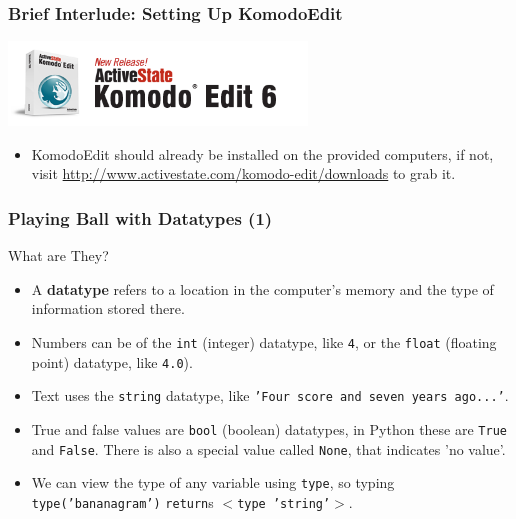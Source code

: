 \documentclass[10pt]{beamer}
\begin{document}
\begin{frame}
  \frametitle{Brief Interlude: Setting Up KomodoEdit}
  \begin{center}
    \includegraphics[width=300px]{KomodoEdit.png}
  \end{center}
  \begin{itemize}
    \item KomodoEdit should already be installed on the provided computers, if not, visit \href{http://www.activestate.com/komodo-edit/downloads}{http://www.activestate.com/komodo-edit/downloads} to grab it.
  \end{itemize}
\end{frame}


\begin{frame}
  \frametitle{Playing Ball with Datatypes (1)}
  \begin{block}{What are They?}
    \begin{itemize}
      \item A \textbf{datatype} refers to a location in the computer's memory and the type of information stored there.
      \item Numbers can be of the \texttt{int} (integer) datatype, like \texttt{4}, or the \texttt{float} (floating point) datatype, like \texttt{4.0}).
      \item Text uses the \texttt{string} datatype, like \texttt{'Four score and seven years ago...'}.
      \item True and false values are \texttt{bool} (boolean) datatypes, in Python these are \texttt{True} and \texttt{False}.
        There is also a special value called \texttt{None}, that indicates 'no value'.
      \item We can view the type of any variable using \texttt{type}, so typing \texttt{type('bananagram')}  \texttt{return}s \texttt{$<$type 'string'$>$}.
    \end{itemize}
  \end{block}
\end{frame}
\end{document}
